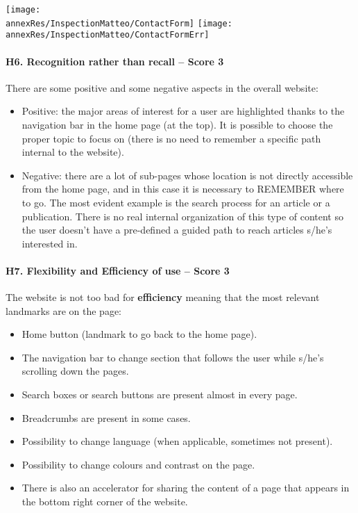 \begin{center}
	\texttt{[image: \\annexRes/InspectionMatteo/ContactForm]}
	\texttt{[image: \\annexRes/InspectionMatteo/ContactFormErr]}
	
\end{center}

\paragraph*{H6. Recognition rather than recall – Score 3}
There are some positive and some negative aspects in the overall website:
\begin{itemize}
	\item Positive: the major areas of interest for a user are highlighted thanks to the navigation bar in the home page (at the top). It is possible to choose the proper topic to focus on (there is no need to remember a specific path internal to the website).
	\item Negative: there are a lot of sub-pages whose location is not directly accessible from the home page, and in this case it is necessary to REMEMBER where to go. The most evident example is the search process for an article or a publication. There is no real internal organization of this type of content so the user doesn't have a pre-defined a guided path to reach articles s/he's interested in.
\end{itemize}


\paragraph*{H7. Flexibility and Efficiency of use – Score 3}
The website is not too bad for \textbf{efficiency} meaning that the most relevant landmarks are on the page:
\begin{itemize}
	\item Home button (landmark to go back to the home page).
	\item The navigation bar to change section that follows the user while s/he's scrolling down the pages.
	\item Search boxes or search buttons are present almost in every page.
	\item Breadcrumbs are present in some cases.
	\item Possibility to change language (when applicable, sometimes not present).
	\item Possibility to change colours and contrast on the page.
	\item There is also an accelerator for sharing the content of a page that appears in the bottom right corner of the website.
\end{itemize}

